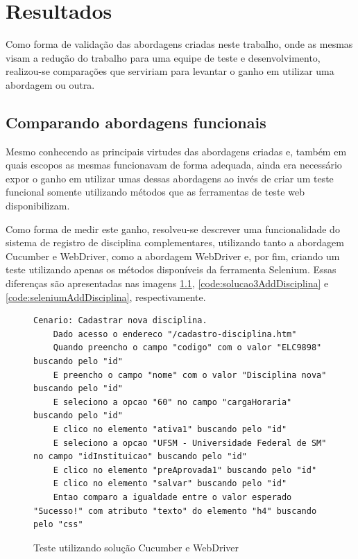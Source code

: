 \documentclass[tg]{mdtufsm}
\begin{document}
\chapter{Resultados}
Como forma de validação das abordagens criadas neste trabalho, onde as mesmas visam a redução do trabalho para uma equipe de teste e desenvolvimento, realizou-se comparações que serviriam para levantar o ganho em utilizar uma abordagem ou outra. 

\section{Comparando abordagens funcionais}
Mesmo conhecendo as principais virtudes das abordagens criadas e, também em quais escopos as mesmas funcionavam de forma adequada, ainda era necessário expor o ganho em utilizar umas dessas abordagens ao invés de criar um teste funcional somente utilizando métodos que as ferramentas de teste web disponibilizam.

Como forma de medir este ganho, resolveu-se descrever uma funcionalidade do sistema de registro de disciplina complementares, utilizando tanto a abordagem Cucumber e WebDriver, como a abordagem WebDriver e, por fim, criando um teste utilizando apenas os métodos disponíveis da ferramenta Selenium. Essas diferenças são apresentadas nas imagens \ref{code:solucao2AddDisciplina}, \ref{code:solucao3AddDisciplina} e \ref{code:seleniumAddDisciplina}, respectivamente.


\begin{figure}[!htt]
	\begin{lstlisting}
Cenario: Cadastrar nova disciplina.
    Dado acesso o endereco "/cadastro-disciplina.htm"
    Quando preencho o campo "codigo" com o valor "ELC9898" buscando pelo "id"
    E preencho o campo "nome" com o valor "Disciplina nova" buscando pelo "id"
    E seleciono a opcao "60" no campo "cargaHoraria" buscando pelo "id"
    E clico no elemento "ativa1" buscando pelo "id"
    E seleciono a opcao "UFSM - Universidade Federal de SM" no campo "idInstituicao" buscando pelo "id"
    E clico no elemento "preAprovada1" buscando pelo "id"
    E clico no elemento "salvar" buscando pelo "id"
    Entao comparo a igualdade entre o valor esperado "Sucesso!" com atributo "texto" do elemento "h4" buscando pelo "css"
	\end{lstlisting}
	\caption{Teste utilizando solução Cucumber e WebDriver}
	\label{code:solucao2AddDisciplina}
\end{figure}
\end{document}
